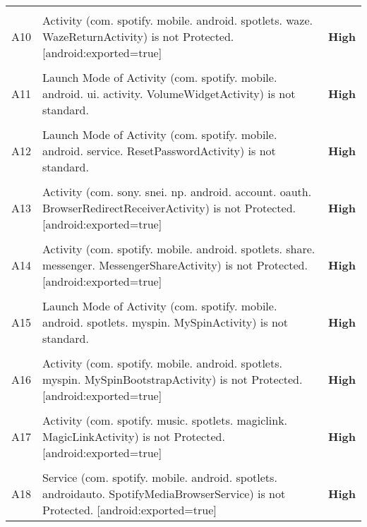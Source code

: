 \documentclass[12p]{article}
\begin{document}
\begin{longtable}{p{0.5cm} p{10cm} p{1.5cm}}
\hline\\	A10&Activity \newline (com. spotify. mobile. android. spotlets. waze. WazeReturnActivity) is not Protected. [android:exported=true]& \color{ferrarired}\textbf{High} \\
\hline\\	A11&Launch Mode of Activity \newline (com. spotify. mobile. android. ui. activity. VolumeWidgetActivity) is not standard.& \color{ferrarired}\textbf{High} \\
\hline\\	A12&Launch Mode of Activity \newline (com. spotify. mobile. android. service. ResetPasswordActivity) is not standard.& \color{ferrarired}\textbf{High} \\
\hline\\	A13&Activity \newline (com. sony. snei. np. android. account. oauth. BrowserRedirectReceiverActivity) is not Protected. [android:exported=true]& \color{ferrarired}\textbf{High} \\
\hline\\	A14&Activity \newline (com. spotify. mobile. android. spotlets. share. messenger. MessengerShareActivity) is not Protected. [android:exported=true]& \color{ferrarired}\textbf{High} \\
\hline\\	A15&Launch Mode of Activity \newline (com. spotify. mobile. android. spotlets. myspin. MySpinActivity) is not standard.& \color{ferrarired}\textbf{High} \\
\hline\\	A16&Activity \newline (com. spotify. mobile. android. spotlets. myspin. MySpinBootstrapActivity) is not Protected. [android:exported=true]& \color{ferrarired}\textbf{High} \\
\hline\\	A17&Activity \newline (com. spotify. music. spotlets. magiclink. MagicLinkActivity) is not Protected. [android:exported=true]& \color{ferrarired}\textbf{High} \\
\hline\\	A18&Service \newline (com. spotify. mobile. android. spotlets. androidauto. SpotifyMediaBrowserService) is not Protected. [android:exported=true]& \color{ferrarired}\textbf{High} \\

\end{longtable}
\end{document}
